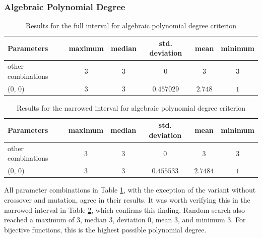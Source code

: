 \subsubsection{Algebraic Polynomial Degree} %
\begin{table}[tb]
\begin{center}
\begin{tabular}{| l | c | c | c | c | c |}
\hline
Parameters & maximum & median & std. deviation & mean & minimum \\ \hline
other combinations & $3$ & $3$ & $0$ & $3$ & $3$ \\ \hline
(0, 0) & $3$ & $3$ & $0.457029$ & $2.748$ & $1$ \\ \hline
\end{tabular}
\caption{Results for the full interval for algebraic polynomial degree criterion} %
\label{tabPOLYNOMIAL_DEGREEParameters}
\end{center}
\end{table}
\begin{table}[bt]
\begin{center}
\begin{tabular}{| l | c | c | c | c | c |}
\hline
Parameters & maximum & median & std. deviation & mean & minimum \\ \hline
other combinations & $3$ & $3$ & $0$ & $3$ & $3$ \\ \hline
(0, 0) & $3$ & $3$ & $0.455533$ & $2.7484$ & $1$ \\ \hline
\end{tabular}
\caption{Results for the narrowed interval for algebraic polynomial degree criterion} %
\label{tabPOLYNOMIAL_DEGREEParametersSmall}
\end{center}
\end{table}
All parameter combinations in Table \ref{tabPOLYNOMIAL_DEGREEParameters}, with the exception of the variant
without crossover and mutation, agree in their results.
It was worth verifying this in the narrowed interval in Table \ref{tabPOLYNOMIAL_DEGREEParametersSmall}, which
confirms this finding.
Random search also reached a maximum of 3, median 3, deviation 0, mean 3, and minimum 3.
For bijective functions, this is the highest possible polynomial degree.
\pagebreak
